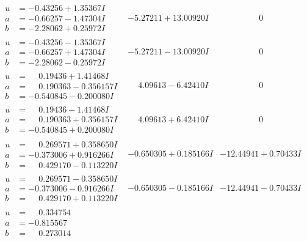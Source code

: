 \documentclass[1p]{elsarticle_modified}
\theoremstyle{definition}
\begin{document}
$$\begin{array}{c|c|c}
\begin{aligned}
u &= -0.43256 + 1.35367 I \\
a &= -0.66257 - 1.47304 I \\
b &= -2.28062 + 0.25972 I\end{aligned}
 & -5.27211 + 13.00920 I & \phantom{-0.000000 } 0 \\ \hline\begin{aligned}
u &= -0.43256 - 1.35367 I \\
a &= -0.66257 + 1.47304 I \\
b &= -2.28062 - 0.25972 I\end{aligned}
 & -5.27211 - 13.00920 I & \phantom{-0.000000 } 0 \\ \hline\begin{aligned}
u &= \phantom{-}0.19436 + 1.41468 I \\
a &= \phantom{-}0.190363 - 0.356157 I \\
b &= -0.540845 - 0.200080 I\end{aligned}
 & \phantom{-}4.09613 - 6.42410 I & \phantom{-0.000000 } 0 \\ \hline\begin{aligned}
u &= \phantom{-}0.19436 - 1.41468 I \\
a &= \phantom{-}0.190363 + 0.356157 I \\
b &= -0.540845 + 0.200080 I\end{aligned}
 & \phantom{-}4.09613 + 6.42410 I & \phantom{-0.000000 } 0 \\ \hline\begin{aligned}
u &= \phantom{-}0.269571 + 0.358650 I \\
a &= -0.373006 + 0.916266 I \\
b &= \phantom{-}0.429170 - 0.113220 I\end{aligned}
 & -0.650305 + 0.185166 I & -12.44941 + 0.70433 I \\ \hline\begin{aligned}
u &= \phantom{-}0.269571 - 0.358650 I \\
a &= -0.373006 - 0.916266 I \\
b &= \phantom{-}0.429170 + 0.113220 I\end{aligned}
 & -0.650305 - 0.185166 I & -12.44941 - 0.70433 I \\ \hline\begin{aligned}
u &= \phantom{-}0.334754\phantom{ +0.000000I} \\
a &= -0.815567\phantom{ +0.000000I} \\
b &= \phantom{-}0.273014\phantom{ +0.000000I}\end{aligned}

\end{array}$$
\end{document}
